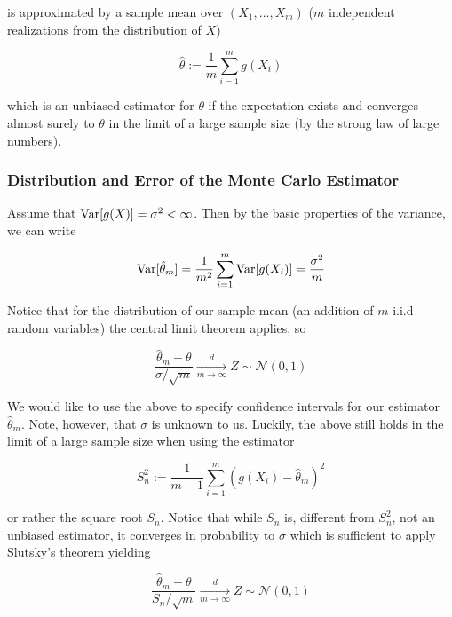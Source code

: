 is approximated by a sample mean over $(X_1, \dots, X_m)$ ($m$ independent realizations from the distribution of $X$)

\begin{equation}
    \hat{\theta} := \frac{1}{m} \sum_{i=1}^{m} g(X_i)
\end{equation}

which is an unbiased estimator for $\theta$ if the expectation exists and converges almost surely to $\theta$ in the limit of a large sample size (by the strong law of large numbers).

\subsubsection{Distribution and Error of the Monte Carlo Estimator}
Assume that $\operatorname{Var}[g(X)] = \sigma^2 < \infty$. Then by the basic properties of the variance, we can write

\begin{equation}
    \operatorname{Var}[\hat{\theta}_m] = \frac{1}{m^2} \sum_{i=1}^{m} \operatorname{Var}[g(X_i)] = \frac{\sigma^2}{m}
\end{equation}

Notice that for the distribution of our sample mean (an addition of $m$ i.i.d random variables) the central limit theorem applies, so

\begin{equation}
    \frac{\hat{\theta}_m - \theta}{\sigma / \sqrt{m}} \xrightarrow[m \rightarrow \infty]{d} Z \sim \mathcal{N}(0, 1)
\end{equation}

We would like to use the above to specify confidence intervals for our estimator $\hat{\theta}_m$. Note, however,
that $\sigma$ is unknown to us. Luckily, the above still holds in the limit of a large sample size when using the
estimator

\begin{equation}
    S_n^2 := \frac{1}{m-1} \sum_{i=1}^{m} (g(X_i) - \hat{\theta}_m)^2
\end{equation}

or rather the square root $S_n$. Notice that while $S_n$ is, different from $S_n^2$, not an unbiased estimator, it converges
in probability to $\sigma$ which is sufficient to apply Slutsky's theorem yielding

\begin{equation}
    \frac{\hat{\theta}_m - \theta}{S_n / \sqrt{m}} \xrightarrow[m \rightarrow \infty]{d} Z \sim \mathcal{N}(0, 1)
\end{equation}

